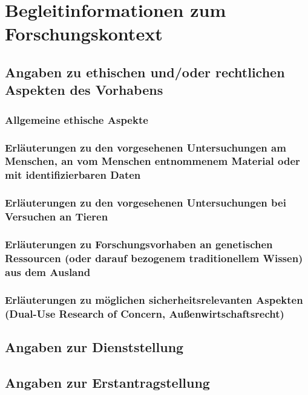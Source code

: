 \documentclass{scrartcl}
\begin{document}
\printbibliography[heading=none]


\section{Begleitinformationen zum Forschungskontext}

\subsection{Angaben zu ethischen und/oder rechtlichen Aspekten des Vorhabens}

\subsubsection{Allgemeine ethische Aspekte}

\subsubsection{Erläuterungen zu den vorgesehenen Untersuchungen am Menschen, an vom Menschen entnommenem Material oder mit identifizierbaren Daten}

\subsubsection{Erläuterungen zu den vorgesehenen Untersuchungen bei Versuchen an Tieren}

\subsubsection{Erläuterungen zu Forschungsvorhaben an genetischen Ressourcen (oder darauf bezogenem traditionellem Wissen) aus dem Ausland}

\subsubsection{Erläuterungen zu möglichen sicherheitsrelevanten Aspekten (\glqq{}Dual-Use Research of Concern\grqq{}, Außenwirtschaftsrecht)}

\subsection{Angaben zur Dienststellung}

\subsection{Angaben zur Erstantragstellung}
\end{document}
